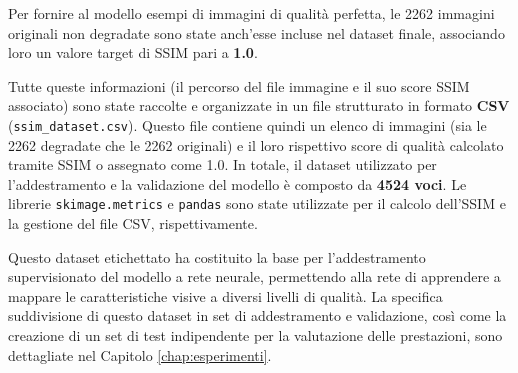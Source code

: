 Per fornire al modello esempi di immagini di qualità perfetta, le 2262 immagini originali non degradate sono state anch'esse incluse nel dataset finale, associando loro un valore target di SSIM pari a \textbf{1.0}.

Tutte queste informazioni (il percorso del file immagine e il suo score SSIM associato) sono state raccolte e organizzate in un file strutturato in formato \textbf{CSV} (\texttt{ssim\_dataset.csv}). Questo file contiene quindi un elenco di immagini (sia le 2262 degradate che le 2262 originali) e il loro rispettivo score di qualità calcolato tramite SSIM o assegnato come 1.0. In totale, il dataset utilizzato per l'addestramento e la validazione del modello è composto da \textbf{4524 voci}. Le librerie \texttt{skimage.metrics} e \texttt{pandas} sono state utilizzate per il calcolo dell'SSIM e la gestione del file CSV, rispettivamente.

Questo dataset etichettato ha costituito la base per l'addestramento supervisionato del modello a rete neurale, permettendo alla rete di apprendere a mappare le caratteristiche visive a diversi livelli di qualità. La specifica suddivisione di questo dataset in set di addestramento e validazione, così come la creazione di un set di test indipendente per la valutazione delle prestazioni, sono dettagliate nel Capitolo \ref{chap:esperimenti}.